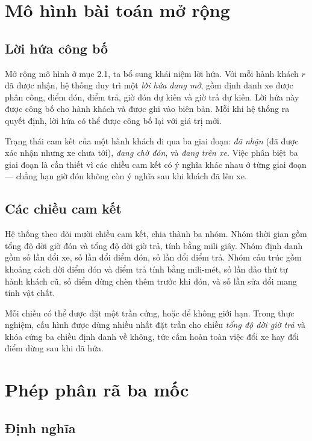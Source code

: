 \section{Mô hình bài toán mở rộng}

\subsection{Lời hứa công bố}

Mở rộng mô hình ở mục 2.1, ta bổ sung khái niệm lời hứa. Với mỗi hành khách $r$ đã được nhận,
hệ thống duy trì một \emph{lời hứa đang mở}, gồm định danh xe được phân công, điểm đón, điểm
trả, giờ đón dự kiến và giờ trả dự kiến. Lời hứa này được công bố cho hành khách và được ghi
vào biên bản. Mỗi khi hệ thống ra quyết định, lời hứa có thể được công bố lại với giá trị mới.

Trạng thái cam kết của một hành khách đi qua ba giai đoạn: \emph{đã nhận} (đã được xác nhận
nhưng xe chưa tới), \emph{đang chờ đón}, và \emph{đang trên xe}. Việc phân biệt ba giai đoạn
là cần thiết vì các chiều cam kết có ý nghĩa khác nhau ở từng giai đoạn --- chẳng hạn giờ đón
không còn ý nghĩa sau khi khách đã lên xe.

\subsection{Các chiều cam kết}

Hệ thống theo dõi mười chiều cam kết, chia thành ba nhóm. Nhóm thời gian gồm tổng độ dời giờ
đón và tổng độ dời giờ trả, tính bằng mili giây. Nhóm định danh gồm số lần đổi xe, số lần đổi
điểm đón, số lần đổi điểm trả. Nhóm cấu trúc gồm khoảng cách dời điểm đón và điểm trả tính bằng
mili-mét, số lần đảo thứ tự hành khách cũ, số điểm dừng chèn thêm trước khi đón, và số lần sửa
đổi mang tính vật chất.

Mỗi chiều có thể được đặt một trần cứng, hoặc để không giới hạn. Trong thực nghiệm, cấu hình
được dùng nhiều nhất đặt trần cho chiều \emph{tổng độ dời giờ trả} và khóa cứng ba chiều định
danh về không, tức cấm hoàn toàn việc đổi xe hay đổi điểm dừng sau khi đã hứa.

\section{Phép phân rã ba mốc}

\subsection{Định nghĩa}

